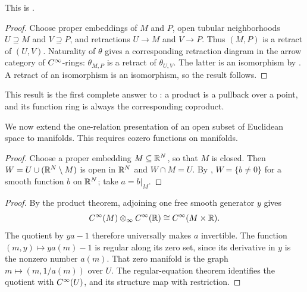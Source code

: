 This is \citet[Chapter~I, Proposition~2.5]{Moerdijk_Reyes_Smooth_Infinitesimal_Analysis}.

\begin{proof}
  Choose proper embeddings of $M$ and $P$, open tubular neighborhoods
  $U\supseteq M$ and $V\supseteq P$, and retractions $U\to M$ and $V\to P$.
  Thus $(M,P)$ is a retract of $(U,V)$. Naturality of $\theta$ gives a
  corresponding retraction diagram in the arrow category of $C^\infty$-rings:
  $\theta_{M,P}$ is a retract of $\theta_{U,V}$. The latter is an isomorphism
  by . A retract of an isomorphism is an
  isomorphism, so the result follows.
\end{proof}

This result is the first complete answer to
: a product is a pullback over a point,
and its function ring is always the corresponding coproduct.

We now extend the one-relation presentation of an open subset of
Euclidean space to manifolds. This requires cozero functions on manifolds.


\begin{proof}
Choose a proper embedding $M\subseteq\mathbb{R}^N$, so that $M$ is closed. Then
$W=U\cup(\mathbb{R}^N\setminus M)$ is open in $\mathbb{R}^N$ and $W\cap M=U$. By
, $W=\{b\neq0\}$ for a smooth function
$b$ on $\mathbb{R}^N$; take $a=b|_M$.
\end{proof}


\begin{proof}
By the product theorem, adjoining one free smooth generator $y$ gives
\[
 C^\infty(M)\otimes_\infty C^\infty(\mathbb{R})\cong C^\infty(M\times\mathbb{R}).
\]
The quotient by $ya-1$ therefore universally makes $a$ invertible.
The function $(m,y)\mapsto ya(m)-1$ is regular along its zero set, since its
derivative in $y$ is the nonzero number $a(m)$. That zero manifold is the
graph $m\mapsto(m,1/a(m))$ over $U$. The regular-equation theorem identifies
the quotient with $C^\infty(U)$, and its structure map with restriction.
\end{proof}

